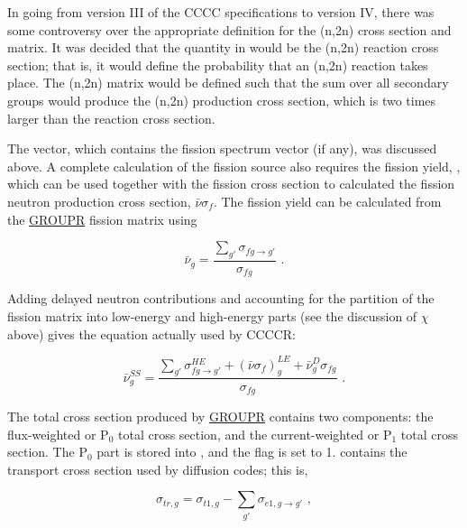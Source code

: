 In going from version III of the CCCC specifications to version IV,
there was some controversy over the appropriate definition for the
(n,2n) cross section and matrix.  It was decided that the quantity
in  would be the (n,2n) reaction cross section; that
is, it would define the probability that an (n,2n) reaction takes
place.  The (n,2n) matrix would be defined such that the sum over
all secondary groups would produce the (n,2n) production cross section,
which is two times larger than the reaction cross section.

The  vector, which contains the fission spectrum vector
(if any), was discussed above.  A complete calculation of the fission
source also requires the fission yield, , which can be used
together with the fission cross section to calculated the fission neutron
production cross section, $\bar{\nu}\sigma_f$.  The fission yield can be
calculated from the \hyperlink{sGROUPRhy}{GROUPR} fission matrix using

\begin{equation}
   \bar{\nu}_g=\frac{\displaystyle\sum_{g'}\sigma_{fg\rightarrow g'}}
      {\sigma_{fg}} \,\,.
\end{equation}
\vspace{0.5 pt}

\noindent
Adding delayed neutron contributions and accounting for the partition of
the fission matrix into low-energy and high-energy parts (see the
discussion of $\chi$ above) gives the equation actually used by CCCCR:

\begin{equation}
   \bar{\nu}^{SS}_g=\frac{\displaystyle\sum_{g'}\sigma^{HE}_{fg\rightarrow g'}
     +(\bar{\nu}\sigma_f)^{LE}_g + \bar{\nu}^D_g\sigma_{fg}}
      {\sigma_{fg}} \,\,.
\end{equation}
\vspace{0.5 pt}

The total cross section produced by \hyperlink{sGROUPRhy}{GROUPR}
contains two components:
the flux-weighted or P$_0$ total cross section, and the current-weighted
or P$_1$ total cross section.  The P$_0$ part is stored into
, and the  flag is set to 1.  
contains the transport cross section used by diffusion codes; this is,

\begin{equation}
   \sigma_{tr,g}= \sigma_{t1,g}-\sum_{g'}\sigma_{e1,g\rightarrow g'} \,\,,
\end{equation}
\vspace{0.5 pt}

